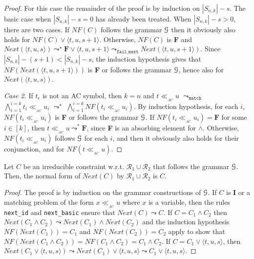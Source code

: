 \documentclass[submission,copyright,creativecommons]{eptcs}
\newcommand \matchth[3]{#1 {\ll}_{{ }_{#3}} {#2}}
\newcommand \matchAC[2]{\matchth{#1}{#2}{AC}}
\newcommand \trip[1]{\langle #1 \rangle}
\newcommand \Eu[1]{\EuScript{#1}}
\numberwithin{subcase}{case}
\begin{document}
\begin{proof}
For this case the remainder of the proof is by induction on $|S_{n,k}|-s$. The
basic case when $|S_{n,k}|-s=0$ has already been treated. When $|S_{n,k}|-s>0$,
there are two cases. If $\textit{NF}(C)$ follows the grammar $\Eu{G}$ then it obviously
also holds for $\textit{NF}(C) \lor \trip{t,u,s+1}$. Otherwise, $\textit{NF}(C)$ is \textbf{F}
and $\textit{Next}(\trip{t,u,s}) \leadsto^{\star} \textbf{F} \lor
\trip{t,u,s+1} \leadsto_{\texttt{fail\_next}} \textit{Next}(\trip{t,u,s+1})$.
Since $|S_{n,k}|-(s+1)<|S_{n,k}|- s$, the  induction hypothesis gives that
$\textit{NF}(\textit{Next}(\trip{t,u,s+1}))$ is \textbf{F} or follows the grammar
$\Eu{G}$, hence also for $\textit{Next}(\trip{t,u,s})$.

\noindent \emph{Case 2.}
If $t_{\epsilon}$ is not an AC symbol, then $k=n$ and $\matchAC{t}{u}$
$\leadsto_{\texttt{match}}$ $\bigwedge_{i = 1}^{i = k} \matchAC{t_i}{u_i}$
$\leadsto^{\star}$ $\bigwedge_{i = 1}^{i = k} \textit{NF}(\matchAC{t_i}{u_i})$.
By induction hypothesis, for each $i$, $\textit{NF}(\matchAC{t_i}{u_i})$ is 
\textbf{F} or follows the grammar $\Eu{G}$. If
$\textit{NF}(\matchAC{t_i}{u_i})=\textbf{F}$ for some $i \in[k] $, then
$\matchAC{t}{u}\leadsto^{*} \textbf{F}$, since \textbf{F} is an
absorbing element for $\land$. Otherwise, $\textit{NF}(\matchAC{t_i}{u_i})$ follows
$\Eu{G}$ for each $i$, and then it
obviously  also holds for their conjunction, and for $\textit{NF}(\matchAC{t}{u})$.
\end{proof}

\begin{lemma}
\label{stabl1:lemma}
Let $C$ be an irreducible constraint w.r.t. $\mathcal{R}_1\cup \mathcal{R}_2$
 that follows  the grammar $\Eu{G}$. Then, the normal form
of $\textit{Next}(C)$ by $\mathcal{R}_1\cup \mathcal{R}_2$ is $C$.
\end{lemma}

\begin{proof}
The proof is by induction on the grammar constructions of $\Eu{G}$.
If $C$ is \textbf{I} or a matching problem of the
form  $\matchAC{x}{u}$ where $x$ is a variable, then the rules
\texttt{next\_id} and \texttt{next\_basic} ensure that $\textit{Next}(C)\leadsto
C$.  If $C=C_1\land C_2$ then $\textit{Next}(C_1\land C_2)\leadsto
\textit{Next}(C_1)\land \textit{Next}(C_2)$ and the induction hypothesis 
  $\textit{NF}(\textit{Next}(C_1))=C_1$
and $\textit{NF}(\textit{Next}(C_2))=C_2$ apply to show that
$\textit{NF}(\textit{Next}(C_1\land C_2)) = \textit{NF}(C_1\land C_2)=C_1\land C_2$. 
If $C=C_1\lor \trip{t,u,s}$,
then $\textit{Next}(C_1\lor \trip{t,u,s}) \leadsto \textit{Next}(C_1)\lor \trip{t,u,s}
 \leadsto C_1 \lor \trip{t,u,s}$.
\end{proof}
\end{document}
